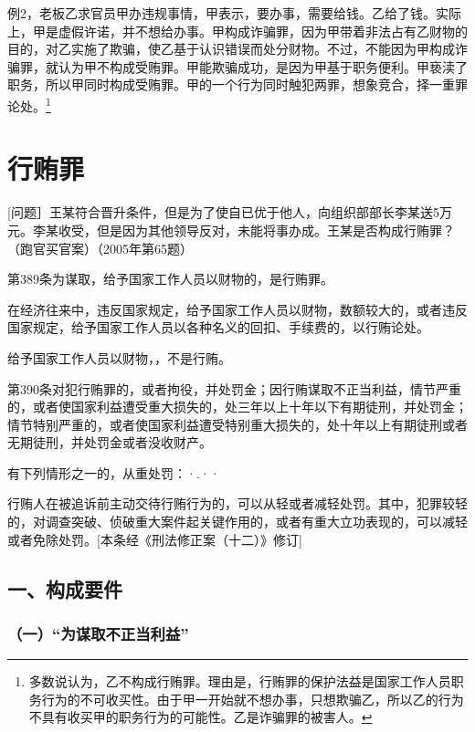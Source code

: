 例2，老板乙求官员甲办违规事情，甲表示，要办事，需要给钱。乙给了钱。实际上，甲是虚假许诺，并不想给办事。甲构成诈骗罪，因为甲带着非法占有乙财物的目的，对乙实施了欺骗，使乙基于认识错误而处分财物。不过，不能因为甲构成诈骗罪，就认为甲不构成受贿罪。甲能欺骗成功，是因为甲基于职务便利。甲亵渎了职务，所以甲同时构成受贿罪。甲的一个行为同时触犯两罪，想象竞合，择一重罪论处。\footnote{多数说认为，乙不构成行贿罪。理由是，行贿罪的保护法益是国家工作人员职务行为的不可收买性。由于甲一开始就不想办事，只想欺骗乙，所以乙的行为不具有收买甲的职务行为的可能性。乙是诈骗罪的被害人。}

\section{行贿罪}

[问题］王某符合晋升条件，但是为了使自已优于他人，向组织部部长李某送5万元。李某收受，但是因为其他领导反对，未能将事办成。王某是否构成行贿罪？（跑官买官案）（2005年第65题）

第389条为谋取，给予国家工作人员以财物的，是行贿罪。

在经济往来中，违反国家规定，给予国家工作人员以财物，数额较大的，或者违反国家规定，给予国家工作人员以各种名义的回扣、手续费的，以行贿论处。

给予国家工作人员以财物，，不是行贿。

第390条对犯行贿罪的，或者拘役，并处罚金；因行贿谋取不正当利益，情节严重的，或者使国家利益遭受重大损失的，处三年以上十年以下有期徒刑，并处罚金；情节特别严重的，或者使国家利益遭受特别重大损失的，处十年以上有期徒刑或者无期徒刑，并处罚金或者没收财产。

有下列情形之一的，从重处罚：·.··

行贿人在被追诉前主动交待行贿行为的，可以从轻或者减轻处罚。其中，犯罪较轻的，对调查突破、侦破重大案件起关键作用的，或者有重大立功表现的，可以减轻或者免除处罚。[本条经《刑法修正案（十二）》修订]

\subsection*{一、构成要件}

\subsubsection*{（一）“为谋取不正当利益”}

